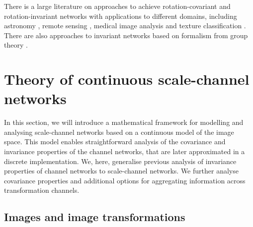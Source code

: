 \documentclass[twocolumn,runningheads]{svjour3}
\begin{document}
There is a large literature on approaches to achieve
rotation-covariant and rotation-invariant networks
\cite{DieFauKav16-ICML,LapSavBuhPol16-CVPR,WorGarTurBro17-CVPR,ZhoYeQiuJia17-CVPR,MarVolKomTui17-ICCV,CohWel17-ICLR,WeiGeiWelBooCoh18-NIPS,WeiHamSto18-CVPR,WorBro18-ECCV,CheHanZhoXu18-IP}
with applications to different domains, including astronomy
\cite{DieWilDam15-RoyAstro},
remote sensing \cite{CheZhoHan17-GeoRemoteSens},
medical image analysis
\cite{WanZheYanJinCheYin17-TBiomedHealth,BekLafVetEppPluDui18-MICCAI,LafBekPluDuiVet20-MedImAnal} 
and texture classification \cite{AndDep18-arXiv}.
There are also approaches to invariant networks based on formalism from
group theory \cite{CohWel16-ICML,PogAns16-book,KonTri18-ICML}.


\section{Theory of continuous scale-channel networks}
\label{sec-theory}

In this section, we will introduce a mathematical framework for
modelling and analysing scale-channel networks based on a continuous
model of the image space. This model enables straightforward analysis
of the covariance and invariance properties of the channel networks,
that are later approximated in a discrete implementation. We, here,
generalise previous analysis of invariance properties of channel
networks \cite{LapSavBuhPol16-CVPR} to scale-channel networks. We
further analyse covariance properties and additional options for
aggregating information across transformation channels. 
 
\subsection{Images and image transformations}
\end{document}
